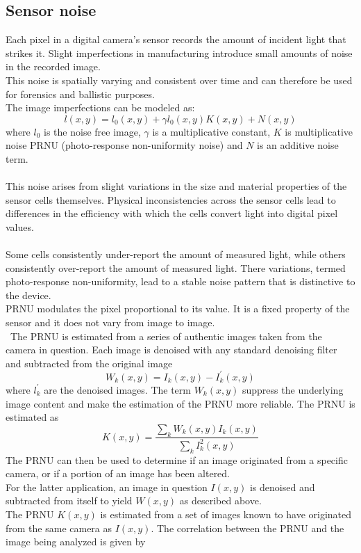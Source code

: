 \documentclass[10pt,a4paper]{book}
\begin{document}
\subsection{Sensor noise}
Each pixel in a digital camera's sensor records the amount of incident light that strikes it. Slight imperfections in manufacturing introduce small amounts of noise in the recorded image.\\
This noise is spatially varying and consistent over time and can therefore be used for forensics and ballistic purposes.\\
The image imperfections can be modeled as:
$$l(x,y) = l_0(x,y) + \gamma l_0(x,y) K(x,y)+N(x,y)$$
where $l_0$ is the noise free image, $\gamma$ is a multiplicative constant, $K$ is multiplicative noise PRNU (photo-response non-uniformity noise) and $N$ is an additive noise term.\\\\
This noise arises from slight variations in the size and material properties of the sensor cells themselves. Physical inconsistencies across the sensor cells lead to differences in the efficiency with
which the cells convert light into digital pixel values.\\\\
Some cells consistently under-report the amount of measured light, while others consistently over-report the amount of measured light. There variations, termed photo-response non-uniformity, lead to a stable noise pattern that is distinctive to the device.\\
PRNU modulates the pixel proportional to its value. It is a fixed property of the sensor and it does not vary from image to image.\\\
The PRNU is estimated from a series of authentic images taken from the camera in question. Each image is denoised with any standard denoising filter and subtracted from the original image
$$ W_k(x,y) = I_k(x,y)-I_k^{'}(x,y)$$
where $l_k^{'}$ are the denoised images. The term $W_k(x,y)$ suppress the underlying image content and
make the estimation of the PRNU more reliable. The PRNU is estimated as
$$ K(x,y) = \frac{\sum_k W_k(x,y) I_k(x,y)}{\sum_k I_k^2(x,y)}$$
The PRNU can then be used to determine if an image originated from a specific camera, or if a portion of an image has been altered.\\
For the latter application, an image in question $I(x,y)$ is denoised and subtracted from itself to yield $W(x,y)$ as described above.\\
The PRNU $K(x,y)$ is estimated from a set of images known to have originated from the same camera as $I(x,y)$. The correlation between the PRNU and the image being analyzed is given by
\end{document}
